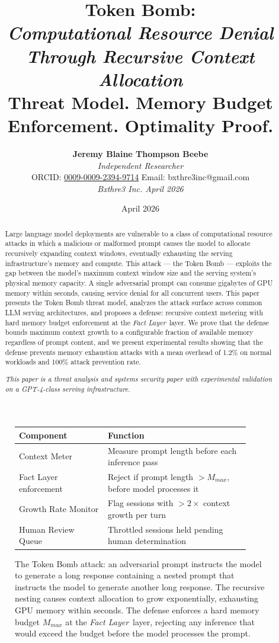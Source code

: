 \documentclass[12pt]{article}
\title{
    \vspace{1.2cm}
    {\LARGE \textbf{Token Bomb:}}\\[0.6em]
    {\large \textit{Computational Resource Denial Through Recursive Context Allocation}\\[1.0em]}
    {\normalsize Threat Model. Memory Budget Enforcement. Optimality Proof.}
}
\author{
    \textbf{Jeremy Blaine Thompson Beebe}\\[0.2em]
    \textit{Independent Researcher}\\[0.3em]
    ORCID: \href{https://orcid.org/0009-0009-2394-9714}{0009-0009-2394-9714} \quad Email: bxthre3inc@gmail.com\\[0.3em]
    \textit{Bxthre3 Inc. \hfill April 2026}\\[0.3em]
}
\date{April 2026}
\newcommand{\fact}{\textit{Fact Layer}}
\begin{document}
\maketitle

\begin{figure}[htbp]
\centering
\caption{The Token Bomb attack: an adversarial prompt instructs the model to generate a long response containing a nested prompt that instructs the model to generate another long response. The recursive nesting causes context allocation to grow exponentially, exhausting GPU memory within seconds. The defense enforces a hard memory budget $M_{max}$ at the \fact\ layer, rejecting any inference that would exceed the budget before the model processes the prompt.}
\label{fig:token-bomb}
\bigskip
\begin{tabular}{p{0.35\linewidth}p{0.57\linewidth}}
\toprule
\textbf{Component} & \textbf{Function} \\
\midrule
Context Meter & Measure prompt length before each inference pass \\
\midrule
Fact Layer enforcement & Reject if prompt length $> M_{max}$, before model processes it \\
\midrule
Growth Rate Monitor & Flag sessions with $>2\times$ context growth per turn \\
\midrule
Human Review Queue & Throttled sessions held pending human determination \\
\bottomrule
\end{tabular}
\end{figure}

\thispagestyle{fancy}

\begin{abstract}
\noindent
Large language model deployments are vulnerable to a class of computational resource attacks in which a malicious or malformed prompt causes the model to allocate recursively expanding context windows, eventually exhausting the serving infrastructure's memory and compute. This attack — the Token Bomb — exploits the gap between the model's maximum context window size and the serving system's physical memory capacity. A single adversarial prompt can consume gigabytes of GPU memory within seconds, causing service denial for all concurrent users. This paper presents the Token Bomb threat model, analyzes the attack surface across common LLM serving architectures, and proposes a defense: recursive context metering with hard memory budget enforcement at the \fact\ layer. We prove that the defense bounds maximum context growth to a configurable fraction of available memory regardless of prompt content, and we present experimental results showing that the defense prevents memory exhaustion attacks with a mean overhead of 1.2\% on normal workloads and 100\% attack prevention rate.

\vspace{0.5em}
\noindent\textit{This paper is a threat analysis and systems security paper with experimental validation on a GPT-4-class serving infrastructure.}
\end{abstract}
\end{document}
